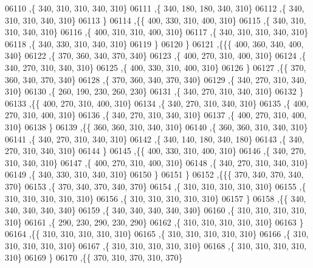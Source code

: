 \begin{DoxyCode}
06110     ,\{   340,   310,   310,   340,   310\}
06111     ,\{   340,   180,   180,   340,   310\}
06112     ,\{   340,   310,   310,   340,   310\}
06113     \}
06114    ,\{\{   400,   330,   310,   400,   310\}
06115     ,\{   340,   310,   310,   340,   310\}
06116     ,\{   400,   310,   310,   400,   310\}
06117     ,\{   340,   310,   310,   340,   310\}
06118     ,\{   340,   330,   310,   340,   310\}
06119     \}
06120    \}
06121   ,\{\{\{   400,   360,   340,   400,   340\}
06122     ,\{   370,   360,   340,   370,   340\}
06123     ,\{   400,   270,   310,   400,   310\}
06124     ,\{   340,   270,   310,   340,   310\}
06125     ,\{   400,   330,   310,   400,   310\}
06126     \}
06127    ,\{\{   370,   360,   340,   370,   340\}
06128     ,\{   370,   360,   340,   370,   340\}
06129     ,\{   340,   270,   310,   340,   310\}
06130     ,\{   260,   190,   230,   260,   230\}
06131     ,\{   340,   270,   310,   340,   310\}
06132     \}
06133    ,\{\{   400,   270,   310,   400,   310\}
06134     ,\{   340,   270,   310,   340,   310\}
06135     ,\{   400,   270,   310,   400,   310\}
06136     ,\{   340,   270,   310,   340,   310\}
06137     ,\{   400,   270,   310,   400,   310\}
06138     \}
06139    ,\{\{   360,   360,   310,   340,   310\}
06140     ,\{   360,   360,   310,   340,   310\}
06141     ,\{   340,   270,   310,   340,   310\}
06142     ,\{   340,   140,   180,   340,   180\}
06143     ,\{   340,   270,   310,   340,   310\}
06144     \}
06145    ,\{\{   400,   330,   310,   400,   310\}
06146     ,\{   340,   270,   310,   340,   310\}
06147     ,\{   400,   270,   310,   400,   310\}
06148     ,\{   340,   270,   310,   340,   310\}
06149     ,\{   340,   330,   310,   340,   310\}
06150     \}
06151    \}
06152   ,\{\{\{   370,   340,   370,   340,   370\}
06153     ,\{   370,   340,   370,   340,   370\}
06154     ,\{   310,   310,   310,   310,   310\}
06155     ,\{   310,   310,   310,   310,   310\}
06156     ,\{   310,   310,   310,   310,   310\}
06157     \}
06158    ,\{\{   340,   340,   340,   340,   340\}
06159     ,\{   340,   340,   340,   340,   340\}
06160     ,\{   310,   310,   310,   310,   310\}
06161     ,\{   290,   230,   290,   230,   290\}
06162     ,\{   310,   310,   310,   310,   310\}
06163     \}
06164    ,\{\{   310,   310,   310,   310,   310\}
06165     ,\{   310,   310,   310,   310,   310\}
06166     ,\{   310,   310,   310,   310,   310\}
06167     ,\{   310,   310,   310,   310,   310\}
06168     ,\{   310,   310,   310,   310,   310\}
06169     \}
06170    ,\{\{   370,   310,   370,   310,   370\}

\end{DoxyCode}

